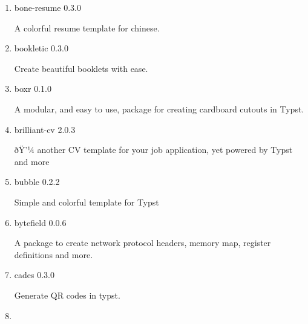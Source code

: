 \begin{enumerate}
  { bob-draw } { 0.1.0 }

  svgbob for typst, powered by wasm
\item
  \href{/universe/package/bone-resume/}{}


  { bone-resume } { 0.3.0 }

  A colorful resume template for chinese.
\item
  \href{/universe/package/bookletic/}{}

  { bookletic } { 0.3.0 }

  Create beautiful booklets with ease.
\item
  \href{/universe/package/boxr/}{}

  { boxr } { 0.1.0 }

  A modular, and easy to use, package for creating cardboard cutouts in
  Typst.
\item
  \href{/universe/package/brilliant-cv/}{}


  { brilliant-cv } { 2.0.3 }

  ðŸ'¼ another CV template for your job application, yet powered by
  Typst and more
\item
  \href{/universe/package/bubble/}{}


  { bubble } { 0.2.2 }

  Simple and colorful template for Typst
\item
  \href{/universe/package/bytefield/}{}

  { bytefield } { 0.0.6 }

  A package to create network protocol headers, memory map, register
  definitions and more.
\item
  \href{/universe/package/cades/}{}

  { cades } { 0.3.0 }

  Generate QR codes in typst.
\item
  \href{/universe/package/caidan/}{}



\end{enumerate}
